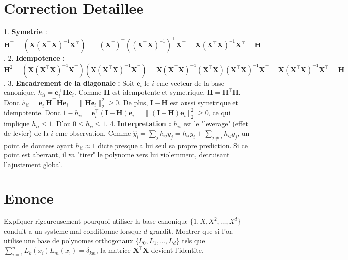 \documentclass[11pt,a4paper]{report}
\begin{document}
\section{Correction Detaillee}
1. \textbf{Symetrie :}
   $\mathbf{H}^\top = (\mathbf{X}(\mathbf{X}^\top\mathbf{X})^{-1}\mathbf{X}^\top)^\top = (\mathbf{X}^\top)^\top ((\mathbf{X}^\top\mathbf{X})^{-1})^\top \mathbf{X}^\top = \mathbf{X}(\mathbf{X}^\top\mathbf{X})^{-1}\mathbf{X}^\top = \mathbf{H}$.
2. \textbf{Idempotence :}
   $\mathbf{H}^2 = (\mathbf{X}(\mathbf{X}^\top\mathbf{X})^{-1}\mathbf{X}^\top)(\mathbf{X}(\mathbf{X}^\top\mathbf{X})^{-1}\mathbf{X}^\top) = \mathbf{X}(\mathbf{X}^\top\mathbf{X})^{-1}(\mathbf{X}^\top\mathbf{X})(\mathbf{X}^\top\mathbf{X})^{-1}\mathbf{X}^\top = \mathbf{X}(\mathbf{X}^\top\mathbf{X})^{-1}\mathbf{X}^\top = \mathbf{H}$.
3. \textbf{Encadrement de la diagonale :}
   Soit $\mathbf{e}_i$ le $i$-eme vecteur de la base canonique. $h_{ii} = \mathbf{e}_i^\top \mathbf{H} \mathbf{e}_i$.
   Comme $\mathbf{H}$ est idempotente et symetrique, $\mathbf{H} = \mathbf{H}^\top \mathbf{H}$.
   Donc $h_{ii} = \mathbf{e}_i^\top \mathbf{H}^\top \mathbf{H} \mathbf{e}_i = \|\mathbf{H}\mathbf{e}_i\|_2^2 \ge 0$.
   De plus, $\mathbf{I} - \mathbf{H}$ est aussi symetrique et idempotente.
   Donc $1 - h_{ii} = \mathbf{e}_i^\top (\mathbf{I} - \mathbf{H}) \mathbf{e}_i = \|(\mathbf{I} - \mathbf{H})\mathbf{e}_i\|_2^2 \ge 0$, ce qui implique $h_{ii} \le 1$.
   D'ou $0 \le h_{ii} \le 1$.
4. \textbf{Interpretation :}
   $h_{ii}$ est le "leverage" (effet de levier) de la $i$-eme observation. Comme $\hat{y}_i = \sum_j h_{ij} y_j = h_{ii} y_i + \sum_{j \neq i} h_{ij} y_j$, un point de donnees ayant $h_{ii} \approx 1$ dicte presque a lui seul sa propre prediction. Si ce point est aberrant, il va "tirer" le polynome vers lui violemment, detruisant l'ajustement global.

\section{Enonce}
Expliquer rigoureusement pourquoi utiliser la base canonique $\{1, X, X^2, \dots, X^d\}$ conduit a un systeme mal conditionne lorsque $d$ grandit.
Montrer que si l'on utilise une base de polynomes orthogonaux $\{L_0, L_1, \dots, L_d\}$ tels que $\sum_{i=1}^n L_k(x_i)L_m(x_i) = \delta_{km}$, la matrice $\mathbf{X}^\top\mathbf{X}$ devient l'identite.
\end{document}
